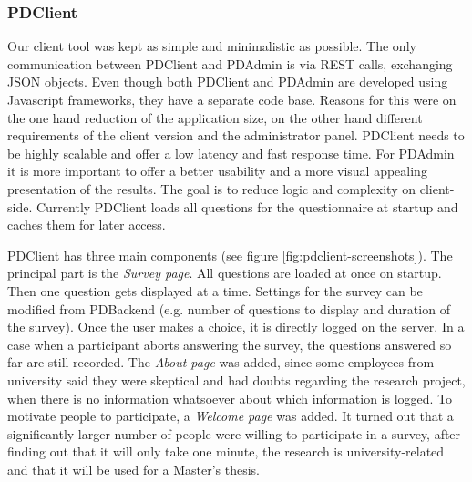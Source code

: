 	\subsubsection{PDClient}

		Our client tool was kept as simple and minimalistic as possible. The only communication between PDClient and PDAdmin is via REST calls, exchanging JSON objects. Even though both PDClient and PDAdmin are developed using Javascript frameworks, they have a separate code base. Reasons for this were on the one hand reduction of the application size, on the other hand different requirements of the client version and the administrator panel. PDClient needs to be highly scalable and offer a low latency and fast response time. For PDAdmin it is more important to offer a better usability and a more visual appealing presentation of the results. The goal is to reduce logic and complexity on client-side. Currently PDClient loads all questions for the questionnaire at startup and caches them for later access. 

		PDClient has three main components (see figure \ref{fig:pdclient-screenshots}). The principal part is the \textit{Survey page}. All questions are loaded at once on startup. Then one question gets displayed at a time. Settings for the survey can be modified from PDBackend (e.g. number of questions to display and duration of the survey). Once the user makes a choice, it is directly logged on the server. In a case when a participant aborts answering the survey, the questions answered so far are still recorded. The \textit{About page} was added, since some employees from university said they were skeptical and had doubts regarding the research project, when there is no information whatsoever about which information is logged. To motivate people to participate, a \textit{Welcome page} was added. It turned out that a significantly larger number of people were willing to participate in a survey, after finding out that it will only take one minute, the research is university-related and that it will be used for a Master's thesis.


